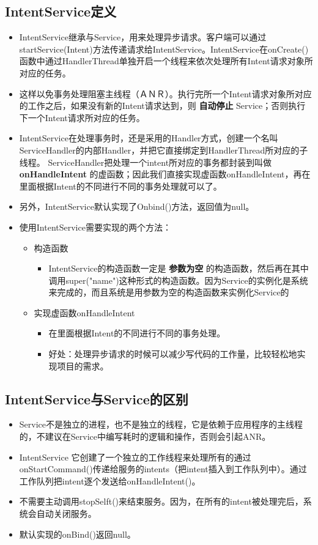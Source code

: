 \documentclass[9pt, b5paper]{article}
\begin{document}
\subsection{IntentService定义}
\label{sec-4-1}
\begin{itemize}
\item IntentService继承与Service，用来处理异步请求。客户端可以通过startService(Intent)方法传递请求给IntentService。IntentService在onCreate()函数中通过HandlerThread单独开启一个线程来依次处理所有Intent请求对象所对应的任务。　
\item 这样以免事务处理阻塞主线程（ＡＮＲ）。执行完所一个Intent请求对象所对应的工作之后，如果没有新的Intent请求达到，则 \textbf{自动停止} Service；否则执行下一个Intent请求所对应的任务。　
\item IntentService在处理事务时，还是采用的Handler方式，创建一个名叫ServiceHandler的内部Handler，并把它直接绑定到HandlerThread所对应的子线程。 ServiceHandler把处理一个intent所对应的事务都封装到叫做 \textbf{onHandleIntent} 的虚函数；因此我们直接实现虚函数onHandleIntent，再在里面根据Intent的不同进行不同的事务处理就可以了。
\item 另外，IntentService默认实现了Onbind()方法，返回值为null。
\item 使用IntentService需要实现的两个方法：
\begin{itemize}
\item 构造函数　
\begin{itemize}
\item IntentService的构造函数一定是 \textbf{参数为空} 的构造函数，然后再在其中调用super("name")这种形式的构造函数。因为Service的实例化是系统来完成的，而且系统是用参数为空的构造函数来实例化Service的
\end{itemize}
\item 实现虚函数onHandleIntent
\begin{itemize}
\item 在里面根据Intent的不同进行不同的事务处理。　
\item 好处：处理异步请求的时候可以减少写代码的工作量，比较轻松地实现项目的需求。
\end{itemize}
\end{itemize}
\end{itemize}
\subsection{IntentService与Service的区别}
\label{sec-4-2}
\begin{itemize}
\item Service不是独立的进程，也不是独立的线程，它是依赖于应用程序的主线程的，不建议在Service中编写耗时的逻辑和操作，否则会引起ANR。
\item IntentService 它创建了一个独立的工作线程来处理所有的通过onStartCommand()传递给服务的intents（把intent插入到工作队列中）。通过工作队列把intent逐个发送给onHandleIntent()。　
\item 不需要主动调用stopSelft()来结束服务。因为，在所有的intent被处理完后，系统会自动关闭服务。
\item 默认实现的onBind()返回null。
\end{itemize}
\end{document}
